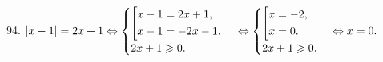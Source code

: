 94. $|x-1|=2x+1\Leftrightarrow\begin{cases}\left[
      \begin{gathered} x-1=2x+1,\hfill\\
      x-1=-2x-1.\hfill \end{gathered}\right.\\
2x+1\geqslant0.\end{cases}\Leftrightarrow\begin{cases}\left[
      \begin{gathered} x=-2,\hfill\\
      x=0.\hfill \end{gathered}\right.\\
2x+1\geqslant0.\end{cases}\Leftrightarrow x=0.$\\
